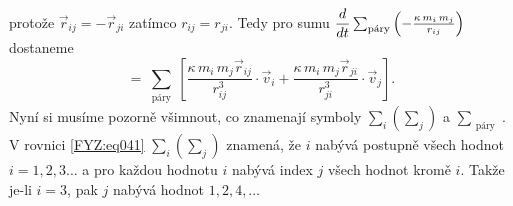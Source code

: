 {    protože \(\vec{r}_{ij} = - \vec{r}_{ji}\) zatímco \(r_{ij} = r_{ji}\). \newline Tedy pro sumu 
    \(\dfrac{d  }{d t}\sum_{\substack{\text{páry}}}\left(-\frac{\kappa\,m_i\,m_j}{r_{ij}}\right) \) 
    dostaneme
    \begin{equation}\label{FYZ:eq043}
     =  \sum_{\substack{\text{páry}}}
              \left[
                \frac{\kappa\,m_i\,m_j\vec{r}_{ij}}{r_{ij}^3}\cdot\vec{v}_i +
                \frac{\kappa\,m_i\,m_j\vec{r}_{ji}}{r_{ji}^3}\cdot\vec{v}_j 
              \right].
    \end{equation}
    Nyní si musíme pozorně všimnout, co znamenají symboly \(\sum_i\left(\sum_j\right)\) a 
    \(\sum_{\substack{\text{páry}}}\). V rovnici \ref{FYZ:eq041} \(\sum_i\left(\sum_j\right)\) 
    znamená, že \(i\) nabývá postupně všech hodnot \(i = 1, 2, 3 \ldots\) a pro každou hodnotu 
    \(i\) nabývá index \(j\) všech hodnot kromě \(i\). Takže je-li \(i = 3\), pak \(j\) nabývá 
    hodnot \(1, 2, 4, \ldots\)
    
}

